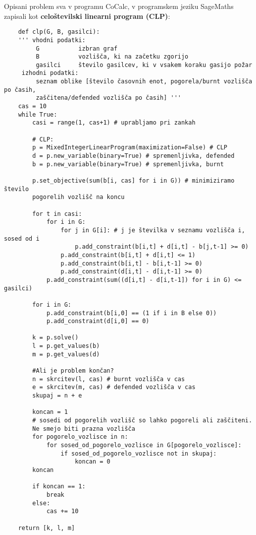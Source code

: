 \documentclass[a4paper, 12pt]{article}
\begin{document}
Opisani problem sva v programu CoCalc, v programskem jeziku SageMaths 
zapisali kot \textbf{celoštevilski linearni program (CLP)}: \\

\begin{verbatim}
    def clp(G, B, gasilci):
    ''' vhodni podatki:
         G           izbran graf
         B           vozlišča, ki na začetku zgorijo
         gasilci     število gasilcev, ki v vsakem koraku gasijo požar
     izhodni podatki:
         seznam oblike [število časovnih enot, pogorela/burnt vozlišča po časih, 
         zaščitena/defended vozlišča po časih] '''
    cas = 10
    while True:
        casi = range(1, cas+1) # uprabljamo pri zankah
    
        # CLP:
        p = MixedIntegerLinearProgram(maximization=False) # CLP
        d = p.new_variable(binary=True) # spremenljivka, defended
        b = p.new_variable(binary=True) # spremenljivka, burnt

        p.set_objective(sum(b[i, cas] for i in G)) # minimiziramo število 
        pogorelih vozlišč na koncu 

        for t in casi:
            for i in G:
                for j in G[i]: # j je številka v seznamu vozlišča i, sosed od i
                    p.add_constraint(b[i,t] + d[i,t] - b[j,t-1] >= 0)
                p.add_constraint(b[i,t] + d[i,t] <= 1)
                p.add_constraint(b[i,t] - b[i,t-1] >= 0)
                p.add_constraint(d[i,t] - d[i,t-1] >= 0)
            p.add_constraint(sum((d[i,t] - d[i,t-1]) for i in G) <= gasilci)

        for i in G:
            p.add_constraint(b[i,0] == (1 if i in B else 0))
            p.add_constraint(d[i,0] == 0)
            
        k = p.solve()
        l = p.get_values(b)
        m = p.get_values(d)
        
        #Ali je problem končan?
        n = skrcitev(l, cas) # burnt vozlišča v cas
        e = skrcitev(m, cas) # defended vozlišča v cas
        skupaj = n + e
        
        koncan = 1
        # sosedi od pogorelih vozlišč so lahko pogoreli ali zaščiteni.
        Ne smejo biti prazna vozlišča
        for pogorelo_vozlisce in n:
            for sosed_od_pogorelo_vozlisce in G[pogorelo_vozlisce]:
                if sosed_od_pogorelo_vozlisce not in skupaj:
                    koncan = 0
        koncan
        
        if koncan == 1:
            break
        else:
            cas += 10
        
    return [k, l, m]
\end{verbatim}
\end{document}
